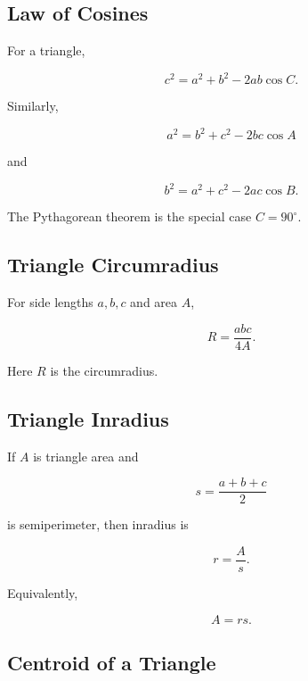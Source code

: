 \subsection{Law of Cosines}
\label{subsec:law-of-cosines-reference}

For a triangle,

\[
\boxed{
c^2
=
a^2+b^2-2ab\cos C.
}
\]

Similarly,

\[
\boxed{
a^2
=
b^2+c^2-2bc\cos A
}
\]

and

\[
\boxed{
b^2
=
a^2+c^2-2ac\cos B.
}
\]

The Pythagorean theorem is the special case \(C=90^\circ\).

\subsection{Triangle Circumradius}
\label{subsec:triangle-circumradius}

For side lengths \(a,b,c\) and area \(A\),

\[
\boxed{
R
=
\frac{abc}{4A}.
}
\]

Here \(R\) is the circumradius.

\subsection{Triangle Inradius}
\label{subsec:triangle-inradius}

If \(A\) is triangle area and

\[
s
=
\frac{a+b+c}{2}
\]

is semiperimeter, then inradius is

\[
\boxed{
r
=
\frac{A}{s}.
}
\]

Equivalently,

\[
\boxed{
A=rs.
}
\]

\subsection{Centroid of a Triangle}
\label{subsec:triangle-centroid-reference}

